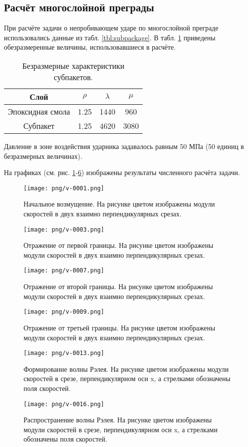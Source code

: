 \subsection{Расчёт многослойной преграды}
При расчёте задачи о непробивающем ударе по многослойной преграде использовались
данные из табл. \ref{tbl:subpackage}. В табл. \ref{tbl:subpackage_2} приведены
обезразмеренные величины, использовавшиеся в расчёте.
\begin{table}[h]
\centering
\begin{tabular}{|c|c|c|c|}
\hline
Слой & $\rho$ & $\lambda$ & $\mu$  \\
\hline
Эпоксидная смола & 1.25 & 1440 & 960 \\
Субпакет & 1.25 & 4620 & 3080 \\
\hline
\end{tabular}
\caption{Безразмерные характеристики субпакетов.}
\label{tbl:subpackage_2}
\end{table}

Давление в зоне воздействия ударника задавалось равным 50 МПа (50 единиц в безразмерных величинах).

На графиках (см. рис. \ref{pic:multilayer_init}-\ref{pic:multilayer_Rayleigh_2}) изображены результаты численного расчёта задачи.
\begin{figure}[htp]
\centering
\texttt{[image: png/v-0001.png]}
\caption{Начальное возмущение. На рисунке цветом изображены модули скоростей в
двух взаимно перпендикулярных срезах.}
\label{pic:multilayer_init}
\end{figure}
\begin{figure}[htp]
\centering
\texttt{[image: png/v-0003.png]}
\caption{Отражение от первой границы. На рисунке цветом изображены модули скоростей в
двух взаимно перпендикулярных срезах.}
\label{pic:multilayer_b1}
\end{figure}
\begin{figure}[htp]
\centering
\texttt{[image: png/v-0007.png]}
\caption{Отражение от второй границы. На рисунке цветом изображены модули скоростей в
двух взаимно перпендикулярных срезах.}
\label{pic:multilayer_b2}
\end{figure}
\begin{figure}[htp]
\centering
\texttt{[image: png/v-0009.png]}
\caption{Отражение от третьей границы. На рисунке цветом изображены модули скоростей в
двух взаимно перпендикулярных срезах.}
\label{pic:multilayer_b3}
\end{figure}
\begin{figure}[htp]
\centering
\texttt{[image: png/v-0013.png]}
\caption{Формирование волны Рэлея. На рисунке цветом изображены модули скоростей
в срезе, перпендикулярном оси x, а стрелками обозначены поля скоростей.}
\label{pic:multilayer_b3}
\end{figure}
\begin{figure}[htp]
\centering
\texttt{[image: png/v-0016.png]}
\caption{Распространение волны Рэлея. На рисунке цветом изображены модули скоростей
в срезе, перпендикулярном оси x, а стрелками обозначены поля скоростей.}
\label{pic:multilayer_Rayleigh_2}
\end{figure}

